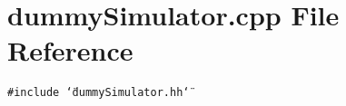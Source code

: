 \section{dummySimulator.cpp File Reference}
\label{dummySimulator_8cpp}


{\tt \#include \char`\"{}dummySimulator.hh\char`\"{}}\par
